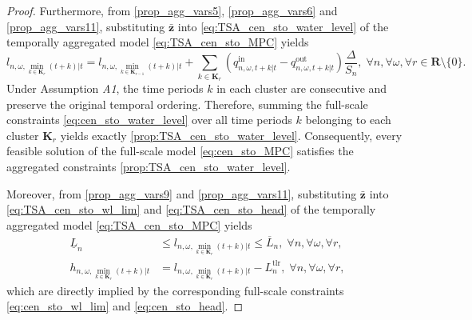 \documentclass[a4paper,fleqn]{cas-sc}
\begin{document}
\begin{proof}
Furthermore, from \eqref{prop_agg_vars5}, \eqref{prop_agg_vars6} and \eqref{prop_agg_vars11},
substituting $\boldsymbol{\bar{z}}$ into \eqref{eq:TSA_cen_sto_water_level}
of the temporally aggregated model \eqref{eq:TSA_cen_sto_MPC} yields
\begin{equation}
l_{n,\omega, \min_{k \in \boldsymbol{K}_r}(t+k)|t}
=
l_{n,\omega, \min_{k \in \boldsymbol{K}_{r-1}}(t+k)|t} +
\sum_{k \in \boldsymbol{K}_r}
\left(q^{\mathrm{in}}_{n,\omega,t+k|t} - q^{\mathrm{out}}_{n,\omega,t+k|t}\right)
\frac{\Delta}{S_n}, \; \forall n, \forall \omega, \forall r \in \boldsymbol{R} \setminus \{0\}.
\label{prop:TSA_cen_sto_water_level}
\end{equation}
Under Assumption \textit{A1}, the time periods $k$ in each cluster are consecutive and preserve the original temporal ordering.
Therefore, summing the full-scale constraints \eqref{eq:cen_sto_water_level} over all time periods $k$ belonging to each cluster $\boldsymbol{K}_r$ yields exactly \eqref{prop:TSA_cen_sto_water_level}.
Consequently, every feasible solution of the full-scale model \eqref{eq:cen_sto_MPC} satisfies the aggregated constraints \eqref{prop:TSA_cen_sto_water_level}.

Moreover, from \eqref{prop_agg_vars9} and \eqref{prop_agg_vars11}, substituting $\boldsymbol{\bar{z}}$ into
\eqref{eq:TSA_cen_sto_wl_lim} and \eqref{eq:TSA_cen_sto_head} of the temporally aggregated model
\eqref{eq:TSA_cen_sto_MPC} yields
\begin{align}
\underline{L}_{n} & \leq
l_{n,\omega, \min_{k \in \boldsymbol{K}_r}(t+k)|t}
\leq \overline{L}_{n},
\; \forall n, \forall \omega, \forall r,
\label{prop:TSA_cen_sto_wl_lim}\\
h_{n,\omega, \min_{k \in \boldsymbol{K}_r}(t+k)|t} & =
l_{n,\omega, \min_{k \in \boldsymbol{K}_r}(t+k)|t} - L^{\mathrm{tlr}}_{n},
\; \forall n, \forall \omega, \forall r,
\label{prop:TSA_cen_sto_head}
\end{align}
which are directly implied by the corresponding full-scale constraints \eqref{eq:cen_sto_wl_lim} and \eqref{eq:cen_sto_head}.


\end{proof}
\end{document}
